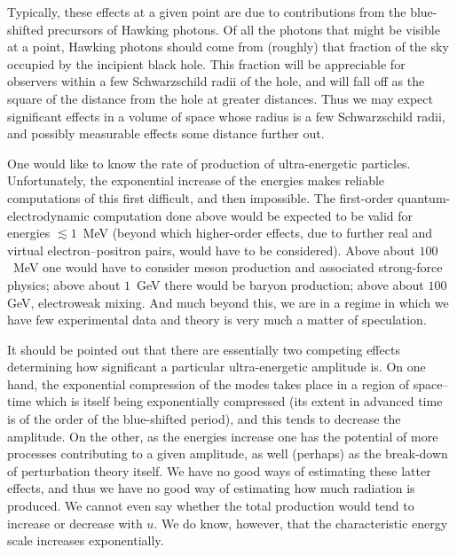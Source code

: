 \documentclass[11pt]{article}
\begin{document}
Typically, these effects at a given point are due to contributions from the
blue-shifted precursors of Hawking photons. Of all the photons that might be
visible at a point, Hawking photons should come from (roughly) that fraction of
the sky occupied by the incipient black hole.   This fraction will be
appreciable for observers within a few Schwarzschild radii of the hole, and
will fall off as the square of the distance from the hole at greater
distances.  Thus we may expect significant effects in a volume of space whose
radius is a few Schwarzschild radii, and possibly measurable effects some
distance further out.

One would like to know the rate of production of ultra-energetic particles.
Unfortunately, the exponential increase of the energies makes reliable
computations of this first difficult, and then impossible.  The first-order
quantum-electrodynamic computation done above would be expected to be valid for
energies $\lesssim 1$~MeV (beyond which higher-order effects, due to  further
real and virtual electron--positron pairs, would have to be considered).  Above
about $100$~MeV one would have to consider meson production and associated
strong-force physics; above about $1$~GeV there would be baryon production;
above about $100$ GeV, electroweak mixing.
And much beyond this, we are in a regime in which we have few experimental data
and theory is very much a matter of speculation.  

It should be pointed out that there are essentially two competing effects
determining how significant a particular ultra-energetic amplitude is.  On one
hand, the exponential compression of the modes takes place in a region of
space--time which is itself being exponentially compressed (its extent in
advanced time is of the order of the blue-shifted period), and this tends to
decrease the amplitude.  On the other, as the energies increase one has the
potential of more processes contributing to a given amplitude, as well (perhaps)
as the break-down of perturbation theory itself.  We have no good ways of
estimating these latter effects, and thus we have no good way of estimating how
much radiation is produced.  We cannot even say whether the total production
would tend to increase or decrease with $u$.  We do know, however, that the
characteristic energy scale increases exponentially.
\end{document}

